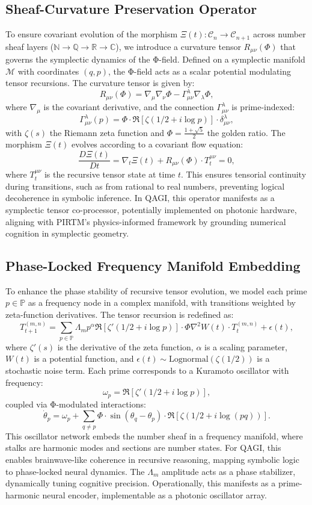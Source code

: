 \documentclass{article}
\theoremstyle{plain}
\begin{document}
\subsection{Sheaf-Curvature Preservation Operator}
To ensure covariant evolution of the morphism \(\Xi(t): \mathcal{C}_n \to \mathcal{C}_{n+1}\) across number sheaf layers (\(\mathbb{N} \to \mathbb{Q} \to \mathbb{R} \to \mathbb{C}\)), we introduce a curvature tensor \(R_{\mu\nu}(\Phi)\) that governs the symplectic dynamics of the Φ-field. Defined on a symplectic manifold \(\mathcal{M}\) with coordinates \((q, p)\), the Φ-field acts as a scalar potential modulating tensor recursions. The curvature tensor is given by:
\[
R_{\mu\nu}(\Phi) = \nabla_{\mu} \nabla_{\nu} \Phi - \Gamma^{\lambda}_{\mu\nu} \nabla_{\lambda} \Phi,
\]
where \(\nabla_{\mu}\) is the covariant derivative, and the connection \(\Gamma^{\lambda}_{\mu\nu}\) is prime-indexed:
\[
\Gamma^{\lambda}_{\mu\nu}(p) = \Phi \cdot \Re[\zeta(1/2 + i \log p)] \cdot \delta^{\lambda}_{\mu\nu},
\]
with \(\zeta(s)\) the Riemann zeta function and \(\Phi = \frac{1 + \sqrt{5}}{2}\) the golden ratio. The morphism \(\Xi(t)\) evolves according to a covariant flow equation:
\[
\frac{D \Xi(t)}{Dt} = \nabla_t \Xi(t) + R_{\mu\nu}(\Phi) \cdot T^{\mu\nu}_t = 0,
\]
where \(T^{\mu\nu}_t\) is the recursive tensor state at time \(t\). This ensures tensorial continuity during transitions, such as from rational to real numbers, preventing logical decoherence in symbolic inference. In QAGI, this operator manifests as a symplectic tensor co-processor, potentially implemented on photonic hardware, aligning with PIRTM’s physics-informed framework by grounding numerical cognition in symplectic geometry.

\subsection{Phase-Locked Frequency Manifold Embedding}
To enhance the phase stability of recursive tensor evolution, we model each prime \(p \in \mathbb{P}\) as a frequency node in a complex manifold, with transitions weighted by zeta-function derivatives. The tensor recursion is redefined as:
\[
T_{t+1}^{(m,n)} = \sum_{p \in \mathbb{P}} \Lambda_m p^{\alpha} \Re[\zeta'(1/2 + i \log p)] \cdot \Phi \nabla^2 W(t) \cdot T_t^{(m,n)} + \epsilon(t),
\]
where \(\zeta'(s)\) is the derivative of the zeta function, \(\alpha\) is a scaling parameter, \(W(t)\) is a potential function, and \(\epsilon(t) \sim \text{Lognormal}(\zeta(1/2))\) is a stochastic noise term. Each prime corresponds to a Kuramoto oscillator with frequency:
\[
\omega_p = \Re[\zeta'(1/2 + i \log p)],
\]
coupled via Φ-modulated interactions:
\[
\dot{\theta}_p = \omega_p + \sum_{q \neq p} \Phi \cdot \sin(\theta_q - \theta_p) \cdot \Re[\zeta(1/2 + i \log(pq))].
\]
This oscillator network embeds the number sheaf in a frequency manifold, where stalks are harmonic modes and sections are number states. For QAGI, this enables brainwave-like coherence in recursive reasoning, mapping symbolic logic to phase-locked neural dynamics. The \(\Lambda_m\) amplitude acts as a phase stabilizer, dynamically tuning cognitive precision. Operationally, this manifests as a prime-harmonic neural encoder, implementable as a photonic oscillator array.
\end{document}
